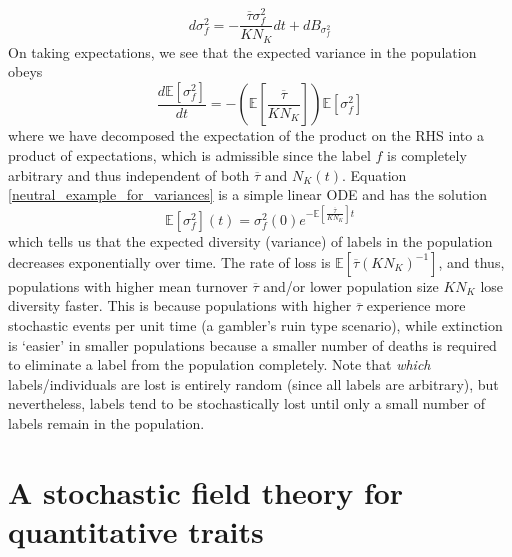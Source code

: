 \begin{equation}
d\sigma^2_f = - \frac{\overline{\tau}\sigma^2_{f}}{KN_K}dt + dB_{\sigma^2_{f}}
\end{equation}
On taking expectations, we see that the expected variance in the population obeys
\begin{equation}
\label{neutral_example_for_variances}
\frac{d \mathbb{E}[\sigma^2_f]}{dt} = - \left(\mathbb{E}\left[\frac{\overline{\tau}}{KN_K}\right]\right)\mathbb{E}[\sigma^2_{f}]
\end{equation}
where we have decomposed the expectation of the product on the RHS into a product of expectations, which is admissible since the label $f$ is completely arbitrary and thus independent of both $\overline{\tau}$ and $N_K(t)$. Equation \eqref{neutral_example_for_variances} is a simple linear ODE and has the solution
\begin{equation}
\mathbb{E}[\sigma^2_f](t) = \sigma^2_f(0)e^{-\mathbb{E}\left[\frac{\overline{\tau}}{KN_K}\right]t}
\end{equation}
which tells us that the expected diversity (variance) of labels in the population decreases exponentially over time. The rate of loss is $\mathbb{E}\left[\overline{\tau}(KN_K)^{-1}\right]$, and thus, populations with higher mean turnover $\overline{\tau}$  and/or lower population size $KN_K$ lose diversity faster. This is because populations with higher $\overline{\tau}$ experience more stochastic events per unit time (a gambler's ruin type scenario), while extinction is `easier' in smaller populations because a smaller number of deaths is required to eliminate a label from the population completely. Note that \emph{which} labels/individuals are lost is entirely random (since all labels are arbitrary), but nevertheless, labels tend to be stochastically lost until only a small number of labels remain in the population.

\section{A stochastic field theory for quantitative traits}


